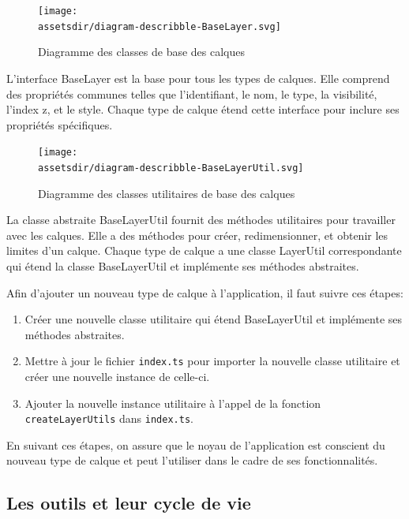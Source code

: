 \begin{figure}[h]
    \centering
    \texttt{[image: \\assetsdir/diagram-describble-BaseLayer.svg]}
    \caption{Diagramme des classes de base des calques}
    \label{fig:baseLayerDiagram}
\end{figure}

L'interface BaseLayer est la base pour tous les types de calques. Elle comprend des propriétés communes telles que l'identifiant, le nom, le type, la visibilité, l'index z, et le style. Chaque type de calque étend cette interface pour inclure ses propriétés spécifiques.

\begin{figure}[h]
    \centering
    \texttt{[image: \\assetsdir/diagram-describble-BaseLayerUtil.svg]}
    \caption{Diagramme des classes utilitaires de base des calques}
    \label{fig:baseLayerUtilDiagram}
\end{figure}

La classe abstraite BaseLayerUtil fournit des méthodes utilitaires pour travailler avec les calques. Elle a des méthodes pour créer, redimensionner, et obtenir les limites d'un calque. Chaque type de calque a une classe LayerUtil correspondante qui étend la classe BaseLayerUtil et implémente ses méthodes abstraites.

Afin d'ajouter un nouveau type de calque à l'application, il faut suivre ces étapes:

\begin{enumerate}
    \item Créer une nouvelle classe utilitaire qui étend BaseLayerUtil et implémente ses méthodes abstraites.
    \item Mettre à jour le fichier \texttt{index.ts} pour importer la nouvelle classe utilitaire et créer une nouvelle instance de celle-ci.
    \item Ajouter la nouvelle instance utilitaire à l'appel de la fonction \texttt{createLayerUtils} dans \texttt{index.ts}.
\end{enumerate}

En suivant ces étapes, on assure que le noyau de l'application est conscient du nouveau type de calque et peut l'utiliser dans le cadre de ses fonctionnalités.

\subsection{Les outils et leur cycle de vie}


